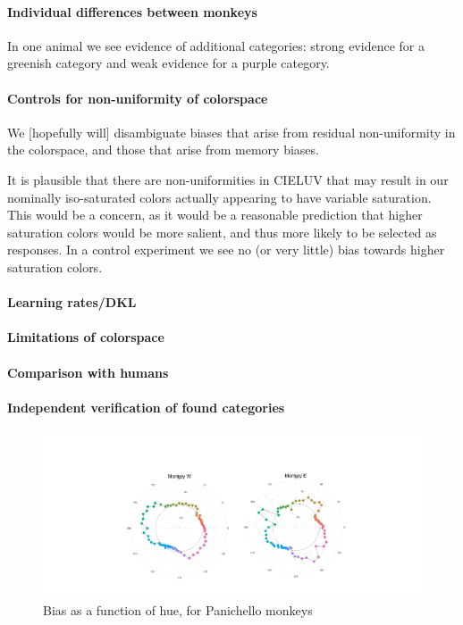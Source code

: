 \paragraph{Individual differences between monkeys}

In one animal we see evidence of additional categories: strong evidence for a greenish category and weak evidence for a purple category.


\paragraph{Controls for non-uniformity of colorspace}

We [hopefully will] disambiguate biases that arise from residual non-uniformity in the colorspace, and those that arise from memory biases.

It is plausible that there are non-uniformities in CIELUV that may result in our nominally iso-saturated colors actually appearing to have variable saturation. This would be a concern, as it would be a reasonable prediction that higher saturation colors would be more salient, and thus more likely to be selected as responses. In a control experiment we see no (or very little) bias towards higher saturation colors.



\paragraph{Learning rates/DKL}
\paragraph{Limitations of colorspace}
\paragraph{Comparison with humans} %
\paragraph{Independent verification of found categories}

\begin{figure}
\includegraphics[width=\textwidth]{../../Figures/Old/panichellobias.pdf}
\caption{Bias as a function of hue, for Panichello monkeys} 
\end{figure}


